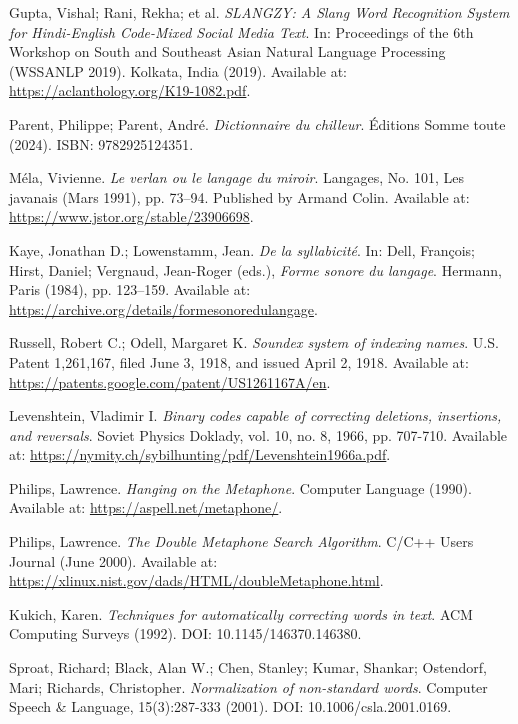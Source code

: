 \documentclass[12pt]{article}
\begin{document}
\begin{thebibliography}{9}
Gupta, Vishal; Rani, Rekha; et al.
\textit{SLANGZY: A Slang Word Recognition System for Hindi-English Code-Mixed Social Media Text}.  
In: Proceedings of the 6th Workshop on South and Southeast Asian Natural Language Processing (WSSANLP 2019).  
Kolkata, India (2019).  
Available at: \url{https://aclanthology.org/K19-1082.pdf}.

Parent, Philippe; Parent, André.
\textit{Dictionnaire du chilleur}.
Éditions Somme toute (2024).  
ISBN: 9782925124351.

Méla, Vivienne.
\textit{Le verlan ou le langage du miroir}.  
Langages, No. 101, Les javanais (Mars 1991), pp. 73–94.  
Published by Armand Colin.  
Available at: \url{https://www.jstor.org/stable/23906698}.

Kaye, Jonathan D.; Lowenstamm, Jean.
\textit{De la syllabicité}.  
In: Dell, François; Hirst, Daniel; Vergnaud, Jean-Roger (eds.), \textit{Forme sonore du langage}.  
Hermann, Paris (1984), pp. 123–159.  
Available at: \url{https://archive.org/details/formesonoredulangage}.

Russell, Robert C.; Odell, Margaret K.
\textit{Soundex system of indexing names}.  
U.S. Patent 1,261,167, filed June 3, 1918, and issued April 2, 1918.  
Available at: \url{https://patents.google.com/patent/US1261167A/en}.

Levenshtein, Vladimir I.
\textit{Binary codes capable of correcting deletions, insertions, and reversals}.  
Soviet Physics Doklady, vol. 10, no. 8, 1966, pp. 707-710.  
Available at: \url{https://nymity.ch/sybilhunting/pdf/Levenshtein1966a.pdf}.

Philips, Lawrence.
\textit{Hanging on the Metaphone}.
Computer Language (1990).
Available at: \url{https://aspell.net/metaphone/}.

Philips, Lawrence.
\textit{The Double Metaphone Search Algorithm}.
C/C++ Users Journal (June 2000).
Available at: \url{https://xlinux.nist.gov/dads/HTML/doubleMetaphone.html}.

Kukich, Karen.
\textit{Techniques for automatically correcting words in text}.
ACM Computing Surveys (1992).
DOI: 10.1145/146370.146380.

Sproat, Richard; Black, Alan W.; Chen, Stanley; Kumar, Shankar; Ostendorf, Mari; Richards, Christopher.
\textit{Normalization of non-standard words}.
Computer Speech \& Language, 15(3):287-333 (2001).
DOI: 10.1006/csla.2001.0169.


\end{thebibliography}
\end{document}
